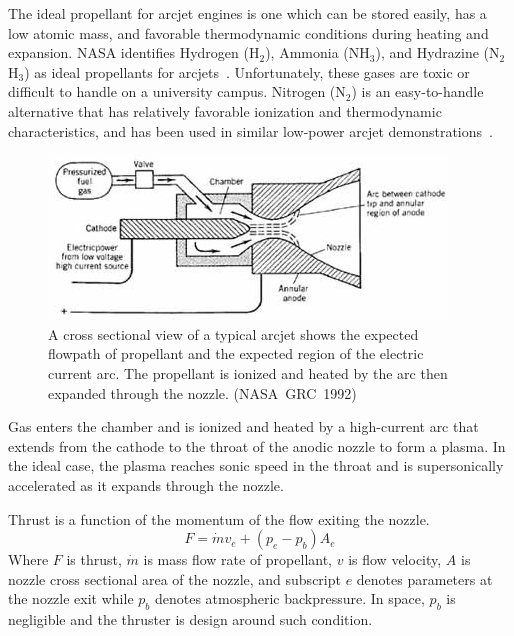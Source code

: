 \documentclass[journal]{IEEEtran}
\begin{document}
The ideal propellant for arcjet engines is one which can be stored easily, has a low atomic mass, and favorable thermodynamic conditions during heating and expansion.
NASA identifies Hydrogen (H$_{2}$), Ammonia (NH$_{3}$), and Hydrazine (N$_{2}$H$_{3}$) as ideal propellants for arcjets~\cite{nasa1992considerations}.
Unfortunately, these gases are toxic or difficult to handle on a university campus.
Nitrogen (N$_{2}$) is an easy-to-handle alternative that has relatively favorable ionization and thermodynamic characteristics, and has been used in similar low-power arcjet demonstrations~\cite{olin2012report,olin2012sim}.
\begin{figure}[htp]
  \centering
  \includegraphics[width=\linewidth]{figs/cross-section_nasa}
  \caption[Arcjet cross-section]{A cross sectional view of a typical arcjet shows the expected flowpath of propellant and the expected region of the electric current arc. The propellant is ionized and heated by the arc then expanded through the nozzle. (NASA~GRC~1992)
\label{fig:x-section-nasa}
}
\end{figure}

Gas enters the chamber and is ionized and heated by a high-current arc that extends from the cathode to the throat of the anodic nozzle to form a plasma.
In the ideal case, the plasma reaches sonic speed in the throat and is supersonically accelerated as it expands through the nozzle.

Thrust is a function of the momentum of the flow exiting the nozzle.
\begin{equation}
\label{eq:thrust}
  F=\dot{m}v_e + (p_e-p_b)A_e
\end{equation}
 Where $F$ is thrust, $\dot{m}$ is mass flow rate of propellant, $v$ is flow velocity, $A$ is nozzle cross sectional area of the nozzle, and subscript $e$ denotes parameters at the nozzle exit while $p_b$ denotes atmospheric backpressure.
 In space, $p_b$ is negligible and the thruster is design around such condition.
\end{document}
